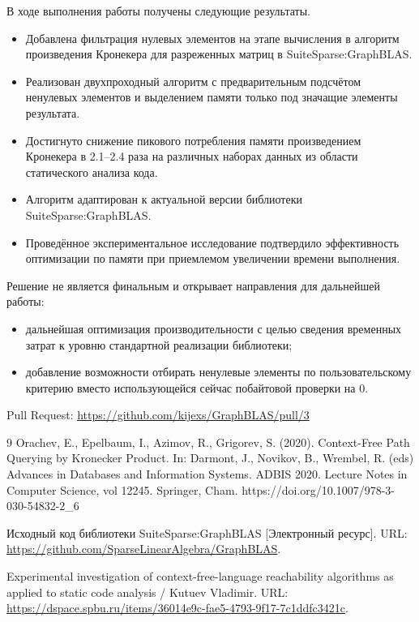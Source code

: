 \documentclass[a4paper]{article}
\begin{document}
В ходе выполнения работы получены следующие результаты.

\begin{itemize}
    \item Добавлена фильтрация нулевых элементов на этапе вычисления в алгоритм произведения Кронекера для разреженных матриц в SuiteSparse:GraphBLAS.
    \item Реализован двухпроходный алгоритм с предварительным подсчётом ненулевых элементов и выделением памяти только под значащие элементы результата.
    \item Достигнуто снижение пикового потребления памяти произведением Кронекера в 2.1--2.4 раза на различных наборах данных из области статического анализа кода.
    \item Алгоритм адаптирован к актуальной версии библиотеки SuiteSparse:GraphBLAS.
    \item Проведённое экспериментальное исследование подтвердило эффективность оптимизации по памяти при приемлемом увеличении времени выполнения.
\end{itemize}

Решение не является финальным и открывает направления для дальнейшей работы:
\begin{itemize}
    \item дальнейшая оптимизация производительности с целью сведения временных затрат к уровню стандартной реализации библиотеки;
    \item добавление возможности отбирать ненулевые элементы по пользовательскому критерию вместо использующейся сейчас побайтовой проверки на 0.
\end{itemize}

Pull Request: \url{https://github.com/kijexs/GraphBLAS/pull/3}

\begin{thebibliography}{9}
Orachev, E., Epelbaum, I., Azimov, R., Grigorev, S. (2020). Context-Free Path Querying by Kronecker Product. In: Darmont, J., Novikov, B., Wrembel, R. (eds) Advances in Databases and Information Systems. ADBIS 2020. Lecture Notes in Computer Science, vol 12245. Springer, Cham. https://doi.org/10.1007/978-3-030-54832-2\_6

Исходный код библиотеки SuiteSparse:GraphBLAS [Электронный ресурс]. URL: \url{https://github.com/SparseLinearAlgebra/GraphBLAS}.

Experimental investigation of context-free-language reachability algorithms as applied to static code analysis / Kutuev Vladimir. URL: \url{https://dspace.spbu.ru/items/36014e9c-fae5-4793-9f17-7c1ddfc3421c}.
\end{thebibliography}
\end{document}
